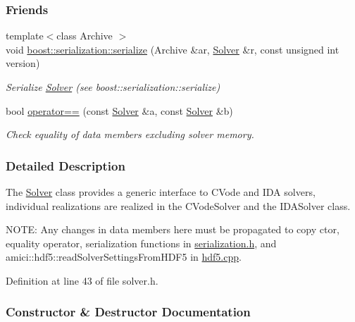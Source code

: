 \subsubsection*{Friends}
\begin{DoxyCompactItemize}
\item 
{\footnotesize template$<$class Archive $>$ }\\void \mbox{\hyperlink{classamici_1_1_solver_af5aefbc0a968aeae501d6d7f753ee2a4}{boost\+::serialization\+::serialize}} (Archive \&ar, \mbox{\hyperlink{classamici_1_1_solver}{Solver}} \&r, const unsigned int version)
\begin{DoxyCompactList}\small\item\em Serialize \mbox{\hyperlink{classamici_1_1_solver}{Solver}} (see boost\+::serialization\+::serialize) \end{DoxyCompactList}\item 
bool \mbox{\hyperlink{classamici_1_1_solver_a252a116a8f94abccc25b2086deb0734b}{operator==}} (const \mbox{\hyperlink{classamici_1_1_solver}{Solver}} \&a, const \mbox{\hyperlink{classamici_1_1_solver}{Solver}} \&b)
\begin{DoxyCompactList}\small\item\em Check equality of data members excluding solver memory. \end{DoxyCompactList}\end{DoxyCompactItemize}


\subsubsection{Detailed Description}
The \mbox{\hyperlink{classamici_1_1_solver}{Solver}} class provides a generic interface to C\+Vode and I\+DA solvers, individual realizations are realized in the C\+Vode\+Solver and the I\+D\+A\+Solver class.

N\+O\+TE\+: Any changes in data members here must be propagated to copy ctor, equality operator, serialization functions in \mbox{\hyperlink{serialization_8h_source}{serialization.\+h}}, and amici\+::hdf5\+::read\+Solver\+Settings\+From\+H\+D\+F5 in \mbox{\hyperlink{hdf5_8cpp_source}{hdf5.\+cpp}}. 

Definition at line 43 of file solver.\+h.



\subsubsection{Constructor \& Destructor Documentation}
\mbox{\label{classamici_1_1_solver_a4676b699f5efede8bee51636bbe8b54a}} 
